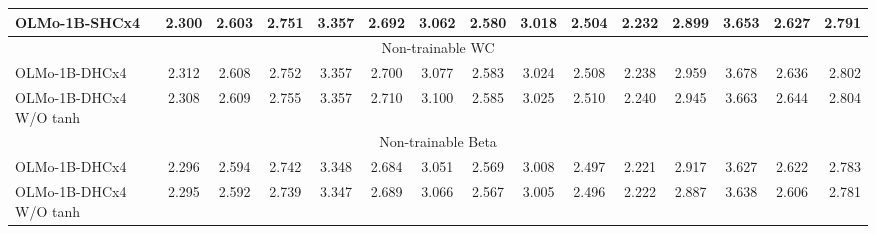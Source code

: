 \begin{table}[h]
{\begin{minipage}{\textheight}
\begin{tabular}{lcccccccccccccr}
OLMo-1B-SHCx4 & 2.300 & 2.603 & 2.751 & 3.357 & 2.692 & 3.062 & 2.580 & 3.018 & 2.504 & 2.232 & 2.899 & 3.653 & 2.627 & 2.791 \\
\midrule
\multicolumn{15}{c}{\cellcolor{gray!20} Non-trainable WC} \\
\midrule
OLMo-1B-DHCx4 & 2.312 & 2.608 & 2.752 & 3.357 & 2.700 & 3.077 & 2.583 & 3.024 & 2.508 & 2.238 & 2.959 & 3.678 & 2.636 & 2.802 \\
OLMo-1B-DHCx4 W/O tanh & 2.308 & 2.609 & 2.755 & 3.357 & 2.710 & 3.100 & 2.585 & 3.025 & 2.510 & 2.240 & 2.945 & 3.663 & 2.644 & 2.804 \\
\midrule
\multicolumn{15}{c}{\cellcolor{gray!20} Non-trainable Beta} \\
\midrule
OLMo-1B-DHCx4 & 2.296 & 2.594 & 2.742 & 3.348 & 2.684 & 3.051 & 2.569 & 3.008 & 2.497 & 2.221 & 2.917 & 3.627 & 2.622 & 2.783 \\
OLMo-1B-DHCx4 W/O tanh & 2.295 & 2.592 & 2.739 & 3.347 & 2.689 & 3.066 & 2.567 & 3.005 & 2.496 & 2.222 & 2.887 & 3.638 & 2.606 & 2.781 \\
\bottomrule
\end{tabular}
\label{tab:v2_validation_set_loss}
\end{minipage}
}
\end{table}



